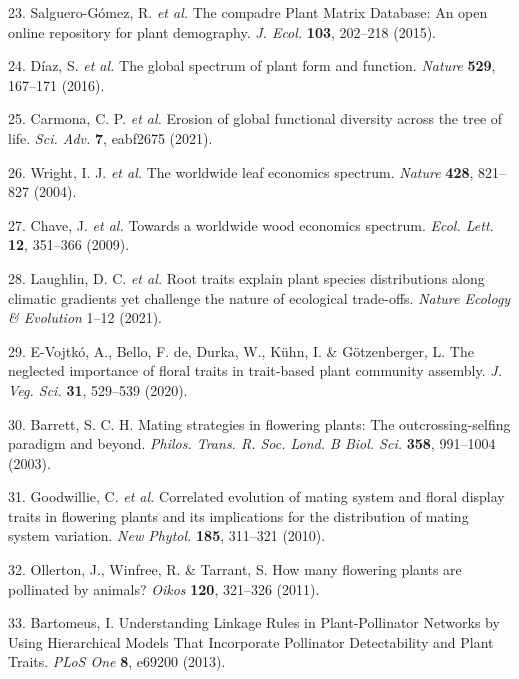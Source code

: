 \documentclass[12pt,a4paper,]{article}
\begin{document}
\hypertarget{ref-salguero2015}{}
23. Salguero-Gómez, R. \emph{et al.} The compadre Plant Matrix Database:
An open online repository for plant demography. \emph{J. Ecol.}
\textbf{103}, 202--218 (2015).

\hypertarget{ref-diaz2016}{}
24. Díaz, S. \emph{et al.} The global spectrum of plant form and
function. \emph{Nature} \textbf{529}, 167--171 (2016).

\hypertarget{ref-carmona2021}{}
25. Carmona, C. P. \emph{et al.} Erosion of global functional diversity
across the tree of life. \emph{Sci. Adv.} \textbf{7}, eabf2675 (2021).

\hypertarget{ref-wright2004}{}
26. Wright, I. J. \emph{et al.} The worldwide leaf economics spectrum.
\emph{Nature} \textbf{428}, 821--827 (2004).

\hypertarget{ref-chave2009}{}
27. Chave, J. \emph{et al.} Towards a worldwide wood economics spectrum.
\emph{Ecol. Lett.} \textbf{12}, 351--366 (2009).

\hypertarget{ref-laughlin2021}{}
28. Laughlin, D. C. \emph{et al.} Root traits explain plant species
distributions along climatic gradients yet challenge the nature of
ecological trade-offs. \emph{Nature Ecology \& Evolution} 1--12 (2021).

\hypertarget{ref-evojtko2020}{}
29. E-Vojtkó, A., Bello, F. de, Durka, W., Kühn, I. \& Götzenberger, L.
The neglected importance of floral traits in trait-based plant community
assembly. \emph{J. Veg. Sci.} \textbf{31}, 529--539 (2020).

\hypertarget{ref-barrett2003}{}
30. Barrett, S. C. H. Mating strategies in flowering plants: The
outcrossing-selfing paradigm and beyond. \emph{Philos. Trans. R. Soc.
Lond. B Biol. Sci.} \textbf{358}, 991--1004 (2003).

\hypertarget{ref-goodwillie2010}{}
31. Goodwillie, C. \emph{et al.} Correlated evolution of mating system
and floral display traits in flowering plants and its implications for
the distribution of mating system variation. \emph{New Phytol.}
\textbf{185}, 311--321 (2010).

\hypertarget{ref-ollerton2011}{}
32. Ollerton, J., Winfree, R. \& Tarrant, S. How many flowering plants
are pollinated by animals? \emph{Oikos} \textbf{120}, 321--326 (2011).

\hypertarget{ref-bartomeus2013}{}
33. Bartomeus, I. Understanding Linkage Rules in Plant-Pollinator
Networks by Using Hierarchical Models That Incorporate Pollinator
Detectability and Plant Traits. \emph{PLoS One} \textbf{8}, e69200
(2013).
\end{document}
